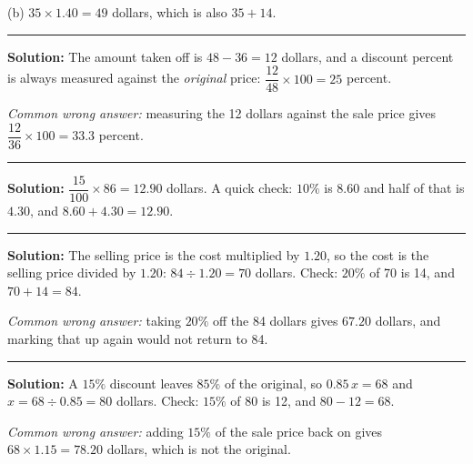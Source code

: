 \documentclass[12pt]{article}
\begin{document}
(b) $35 \times 1.40 = 49$ dollars, which is also $35 + 14$. 

\vspace{0.25cm}\noindent\rule{\linewidth}{0.2pt}\vspace{0.25cm}


\textbf{Solution:} The amount taken off is $48 - 36 = 12$ dollars, and a
discount percent is always measured against the \emph{original} price:
$\dfrac{12}{48} \times 100 = 25$ percent. 

\textit{Common wrong answer:} measuring the 12 dollars against the sale price
gives $\dfrac{12}{36} \times 100 = 33.3$ percent.

\vspace{0.25cm}\noindent\rule{\linewidth}{0.2pt}\vspace{0.25cm}


\textbf{Solution:} $\dfrac{15}{100} \times 86 = 12.90$ dollars. A quick check:
$10\%$ is $8.60$ and half of that is $4.30$, and $8.60 + 4.30 = 12.90$. 

\vspace{0.25cm}\noindent\rule{\linewidth}{0.2pt}\vspace{0.25cm}


\textbf{Solution:} The selling price is the cost multiplied by $1.20$, so the
cost is the selling price divided by $1.20$:
$84 \div 1.20 = 70$ dollars. Check: $20\%$ of 70 is 14, and $70 + 14 = 84$. 

\textit{Common wrong answer:} taking $20\%$ off the 84 dollars gives $67.20$
dollars, and marking that up again would not return to 84.

\vspace{0.25cm}\noindent\rule{\linewidth}{0.2pt}\vspace{0.25cm}


\textbf{Solution:} A $15\%$ discount leaves $85\%$ of the original, so
$0.85\,x = 68$ and $x = 68 \div 0.85 = 80$ dollars. Check: $15\%$ of 80 is 12,
and $80 - 12 = 68$. 

\textit{Common wrong answer:} adding $15\%$ of the sale price back on gives
$68 \times 1.15 = 78.20$ dollars, which is not the original.
\end{document}
